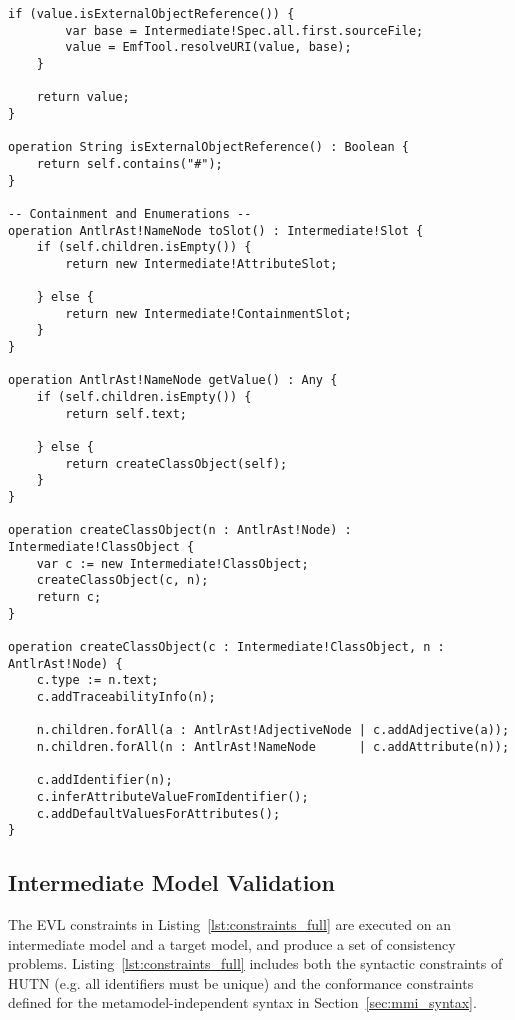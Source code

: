 \begin{lstlisting}[caption=Transforming AST models to intermediate models with ETL., label=lst:m2m_full, language=ETL]
	if (value.isExternalObjectReference()) {
	    var base = Intermediate!Spec.all.first.sourceFile;
		value = EmfTool.resolveURI(value, base);
	}
	
	return value;
}

operation String isExternalObjectReference() : Boolean {
	return self.contains("#");
}

-- Containment and Enumerations --
operation AntlrAst!NameNode toSlot() : Intermediate!Slot {
	if (self.children.isEmpty()) {
		return new Intermediate!AttributeSlot;
		
	} else {
		return new Intermediate!ContainmentSlot;
	}	
}

operation AntlrAst!NameNode getValue() : Any {
	if (self.children.isEmpty()) {
		return self.text;
		
	} else {
		return createClassObject(self);
	}
}

operation createClassObject(n : AntlrAst!Node) : Intermediate!ClassObject {
	var c := new Intermediate!ClassObject;
	createClassObject(c, n);
	return c;
}

operation createClassObject(c : Intermediate!ClassObject, n : AntlrAst!Node) {
	c.type := n.text;
	c.addTraceabilityInfo(n);
	
	n.children.forAll(a : AntlrAst!AdjectiveNode | c.addAdjective(a));
	n.children.forAll(n : AntlrAst!NameNode      | c.addAttribute(n));
	
	c.addIdentifier(n);
	c.inferAttributeValueFromIdentifier();
	c.addDefaultValuesForAttributes();
}
\end{lstlisting}

\subsection{Intermediate Model Validation}
The EVL constraints in Listing~\ref{lst:constraints_full} are executed on an intermediate model and a target model, and produce a set of consistency problems. Listing~\ref{lst:constraints_full} includes both the syntactic constraints of HUTN (e.g. all identifiers must be unique) and the conformance constraints defined for the metamodel-independent syntax in Section~\ref{sec:mmi_syntax}.

